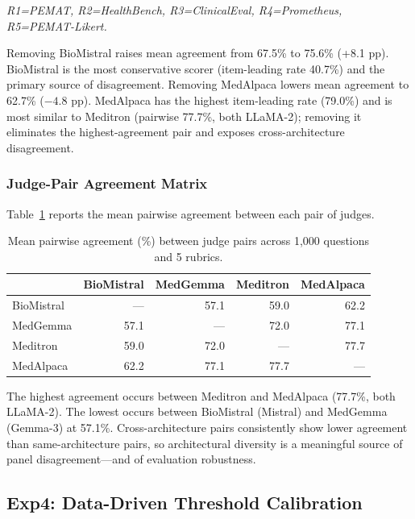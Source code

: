 \documentclass[conference]{IEEEtran}
\begin{document}
\noindent\textit{R1=PEMAT, R2=HealthBench, R3=ClinicalEval, R4=Prometheus, R5=PEMAT-Likert.}

Removing BioMistral raises mean agreement from 67.5\% to 75.6\%
(+8.1 pp). BioMistral is the most conservative scorer (item-leading
rate 40.7\%) and the primary source of disagreement. Removing
MedAlpaca lowers mean agreement to 62.7\% ($-4.8$ pp). MedAlpaca
has the highest item-leading rate (79.0\%) and is most similar to
Meditron (pairwise 77.7\%, both LLaMA-2); removing it eliminates the
highest-agreement pair and exposes cross-architecture disagreement.

\subsubsection{Judge-Pair Agreement Matrix}

Table~\ref{tab:pairs} reports the mean pairwise agreement between
each pair of judges.

\begin{table}[htbp]
\caption{Mean pairwise agreement (\%) between judge pairs across
1,000 questions and 5 rubrics.}
\label{tab:pairs}
\begin{flushleft}
\small
\setlength{\tabcolsep}{4pt}
\begin{tabular}{|l|r|r|r|r|}
\hline
& \textbf{BioMistral} & \textbf{MedGemma} & \textbf{Meditron} & \textbf{MedAlpaca} \\
\hline
BioMistral  & ---   & 57.1 & 59.0 & 62.2 \\
MedGemma    & 57.1 & ---  & 72.0 & 77.1 \\
Meditron    & 59.0 & 72.0 & ---  & 77.7 \\
MedAlpaca   & 62.2 & 77.1 & 77.7 & --- \\
\hline
\end{tabular}
\end{flushleft}
\end{table}

The highest agreement occurs between Meditron and MedAlpaca
(77.7\%, both LLaMA-2). The lowest occurs between BioMistral
(Mistral) and MedGemma (Gemma-3) at 57.1\%. Cross-architecture pairs
consistently show lower agreement than same-architecture pairs, so
architectural diversity is a meaningful source of panel
disagreement---and of evaluation robustness.

\subsection{Exp4: Data-Driven Threshold Calibration}
\end{document}
